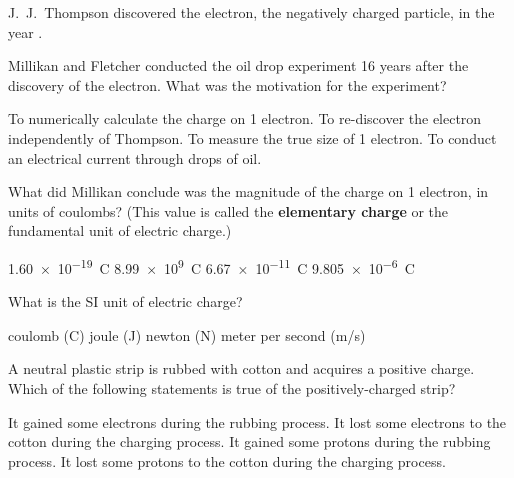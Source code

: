 \documentclass{exam}
\begin{document}
\begin{questions}

\question
J.~J.~Thompson discovered the electron, the negatively charged particle, in the year \fillin[1897].

\begin{randomizechoices}
\end{randomizechoices}

\question
Millikan and Fletcher conducted the oil drop experiment 16 years after the discovery of the electron. What was the motivation for the experiment?

\begin{randomizechoices}
    \correctchoice To numerically calculate the charge on 1 electron.
    \choice To re-discover the electron independently of Thompson.
    \choice To measure the true size of 1 electron.
    \choice To conduct an electrical current through drops of oil.
\end{randomizechoices}

\question
What did Millikan conclude was the magnitude of the charge on 1 electron, in units of coulombs? (This value is called the \textbf{elementary charge} or the fundamental unit of electric charge.)

\begin{randomizechoices}
    \correctchoice \SI{1.60e-19}{C}
    \choice \SI{8.99e9}{C}
    \choice \SI{6.67e-11}{C}
    \choice \SI{9.805e-6}{C}
\end{randomizechoices}

\question
What is the SI unit of electric charge?

\begin{randomizechoices}
\correctchoice coulomb (C)
\choice joule (J)
\choice newton (N)
\choice meter per second (m/s)
\end{randomizechoices}

\question
A neutral plastic strip is rubbed with cotton and acquires a positive charge. Which of the following statements is true of the positively-charged strip?

\begin{randomizechoices}
\choice It gained some electrons during the rubbing process.
\correctchoice It lost some electrons to the cotton during the charging process.
\choice It gained some protons during the rubbing process.
\choice It lost some protons to the cotton during the charging process.
\end{randomizechoices}




\end{questions}
\end{document}
